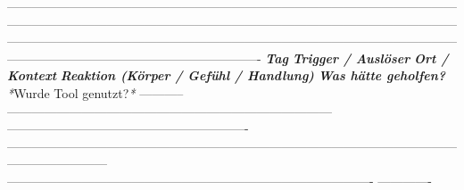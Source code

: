 -------------------------------------------------------------------------------------------------------------------------------------------------------------------------------------------------------------------------------------------------------------------------------------------------------------------------------------------------------------------------------------------------
\textbf{\textit{Tag}}   \textbf{\textit{\textcolor{ctmmRed}{Trigger} / Auslöser}}                                                       \textbf{\textit{Ort / Kontext}}                                        \textbf{\textit{Reaktion (Körper / Gefühl / Handlung)}}                                                                                          \textbf{\textit{Was hätte geholfen?}}                                                                \textit{*}Wurde Tool
genutzt?\textit{*}
----------- ------------------------------------------------------------------------------ ---------------------------------------------------------- ------------------------------------------------------------------------------------------------------------------------------------ ---------------------------------------------------------------------------------------- -------------

